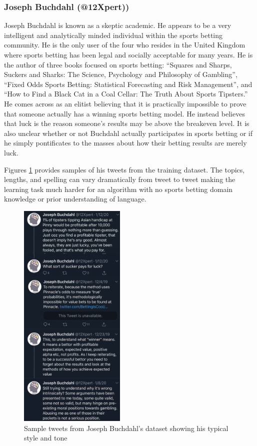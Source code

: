 \documentclass[5p,authoryear]{elsarticle}
\begin{document}
\subsubsection{Joseph Buchdahl (@12Xpert))}\label{buch}

Joseph Buchdahl is known as a skeptic academic. He appears to be a very intelligent and analytically minded individual within the sports betting community. He is the only user of the four who resides in the United Kingdom where sports betting has been legal and socially acceptable for many years. He is the author of three books focused on sports betting: “Squares and Sharps, Suckers and Sharks: The Science, Psychology and Philosophy of Gambling”, “Fixed Odds Sports Betting: Statistical Forecasting and Risk Management”, and “How to Find a Black Cat in a Coal Cellar: The Truth About Sports Tipsters.” He comes across as an elitist believing that it is practically impossible to prove that someone actually has a winning sports betting model. He instead believes that luck is the reason someone’s results may be above the breakeven level. It is also unclear whether or not Buchdahl actually participates in sports betting or if he simply pontificates to the masses about how their betting results are merely luck.

Figures \ref{tweet xpert} provides samples of his tweets from the training dataset. The topics, lengths, and spelling can vary dramatically from tweet to tweet making the learning task much harder for an algorithm with no sports betting domain knowledge or prior understanding of language.

\begin{figure}[!htb] \centering
	\includegraphics[width=2.0in]{figures/Tweet_Xpert.png}
	\caption[]{Sample tweets from Joseph Buchdahl's dataset showing his typical style and tone} 
	\label{tweet xpert} 
\end{figure}
\end{document}
